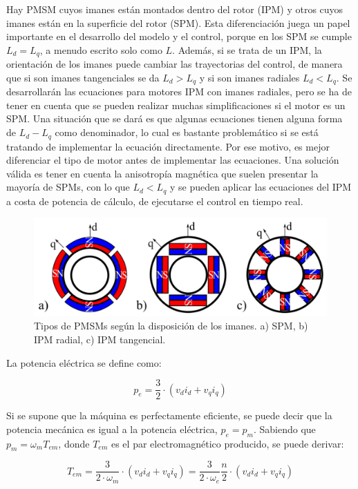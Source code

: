 Hay PMSM cuyos imanes están montados dentro del rotor (IPM) y otros cuyos imanes están en la superficie del rotor (SPM). Esta diferenciación juega un papel importante en el desarrollo del modelo y el control, porque en los SPM se cumple \(L_d = L_q\), a menudo escrito solo como \(L\). Además, si se trata de un IPM, la orientación de los imanes puede cambiar las trayectorias del control, de manera que si son imanes tangenciales se da \(L_d > L_q\) y si son imanes radiales \(L_d < L_q\). Se desarrollarán las ecuaciones para motores IPM con imanes radiales, pero se ha de tener en cuenta que se pueden realizar muchas simplificaciones si el motor es un SPM. Una situación que se dará es que algunas ecuaciones tienen alguna forma de \(L_d - L_q\) como denominador, lo cual es bastante problemático si se está tratando de implementar la ecuación directamente. Por ese motivo, es mejor diferenciar el tipo de motor antes de implementar las ecuaciones. Una solución válida es tener en cuenta la anisotropía magnética que suelen presentar la mayoría de SPMs, con lo que \(L_d < L_q\) y se pueden aplicar las ecuaciones del IPM a costa de potencia de cálculo, de ejecutarse el control en tiempo real.

\begin{figure}[H]
	\centering
	\includegraphics[width=0.7\linewidth]{fig/motor-types}
	\caption{Tipos de PMSMs según la disposición de los imanes. a) SPM, b) IPM radial, c) IPM tangencial.}
\end{figure}


La potencia eléctrica se define como:

\begin{equation}
p_e = \frac{3}{2}\cdot(v_d i_d + v_q i_q)
\end{equation}

Si se supone que la máquina es perfectamente eficiente, se puede decir que la potencia mecánica es igual a la potencia eléctrica, \(p_e = p_m\). Sabiendo que \(p_m = \omega_m T_{em}\), donde \(T_{em}\) es el par electromagnético producido, se puede derivar:

\begin{equation}
T_{em} = \frac{3}{2\cdot \omega_m}\cdot(v_d i_d + v_q i_q) = \frac{3}{2\cdot \omega_e}\frac{n}{2}\cdot(v_d i_d + v_q i_q)
\end{equation}

